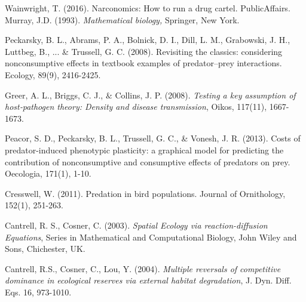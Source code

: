 \documentclass[10pt]{amsart}
\theoremstyle{definition}
\begin{document}
\begin{thebibliography}{}
Wainwright, T. (2016). Narconomics: How to run a drug cartel. PublicAffairs.
%
\newblock Murray, J.D. (1993). \emph{Mathematical biology,} Springer, New York.

Peckarsky, B. L., Abrams, P. A., Bolnick, D. I., Dill, L. M., Grabowski, J. H., Luttbeg, B., ... \& Trussell, G. C. (2008). Revisiting the classics: considering nonconsumptive effects in textbook examples of predator–prey interactions. Ecology, 89(9), 2416-2425.
  
  Greer, A. L., Briggs, C. J., $\&$ Collins, J. P. (2008). 
  \newblock \emph{ Testing a key assumption of host‐pathogen theory: Density and disease transmission}, Oikos, 117(11), 1667-1673.

%

Peacor, S. D., Peckarsky, B. L., Trussell, G. C., \& Vonesh, J. R. (2013). Costs of predator-induced phenotypic plasticity: a graphical model for predicting the contribution of nonconsumptive and consumptive effects of predators on prey. Oecologia, 171(1), 1-10.


Cresswell, W. (2011). Predation in bird populations. Journal of Ornithology, 152(1), 251-263.
   
   Cantrell, R. S., Cosner, C. (2003).
\newblock\emph{Spatial Ecology via reaction-diffusion Equations}, 
\newblock Series in Mathematical and Computational Biology, John Wiley and Sons, Chichester, UK.   
   
  Cantrell, R.S., Cosner, C., Lou, Y.  (2004).
\newblock\emph{ Multiple reversals of competitive dominance in ecological reserves via external habitat degradation}, 
\newblock J. Dyn. Diff. Eqs. 16, 973-1010.   
   

\end{thebibliography}
\end{document}
